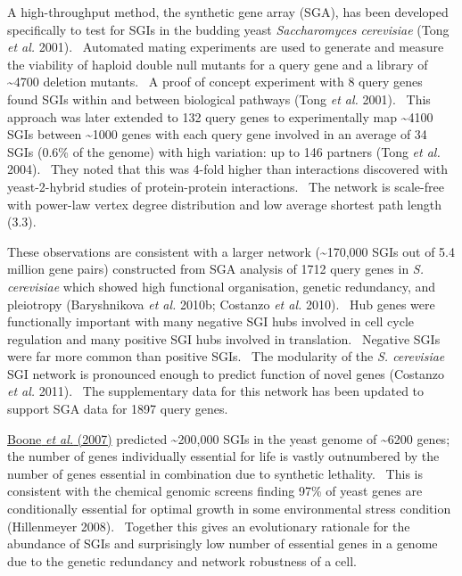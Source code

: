 A high-throughput method, the synthetic gene array (SGA), has been
developed specifically to test for SGIs in the budding yeast
\textit{Saccharomyces cerevisiae} (Tong\textit{ et al.} 2001).
\ Automated mating experiments are used to generate and measure the
viability of haploid double null mutants for a query gene and a library
of \~{}4700 deletion mutants. \ A proof of concept experiment with 8
query genes found SGIs within and between biological pathways
(Tong\textit{ et al.} 2001). \ This approach was later extended to 132
query genes to experimentally map \~{}4100 SGIs between \~{}1000 genes
with each query gene involved in an average of 34 SGIs (0.6\% of the
genome) with high variation: up to 146 partners (Tong\textit{ et al.}
2004). \ They noted that this was 4-fold higher than interactions
discovered with yeast-2-hybrid studies of protein-protein interactions.
\ The network is scale-free with power-law vertex degree distribution
and low average shortest path length (3.3). \ 


These observations are consistent with a larger network (\~{}170,000
SGIs out of 5.4 million gene pairs) constructed from SGA analysis of
1712 query genes in \textit{S. cerevisiae} which showed high functional
organisation, genetic redundancy, and pleiotropy (Baryshnikova\textit{
et al.} 2010b; Costanzo\textit{ et al.} 2010). \ Hub genes were
functionally important with many negative SGI hubs involved in cell
cycle regulation and many positive SGI hubs involved in translation.
\ Negative SGIs were far more common than positive SGIs. \ The
modularity of the \textit{S. cerevisiae} SGI network is pronounced
enough to predict function of novel genes (Costanzo\textit{ et al.}
2011). \ The supplementary data for this network has been updated to
support SGA data for 1897 query genes. \ 


\hyperlink{ENREF15}{Boone}\hyperlink{ENREF15}{\textit{ et
al.}}\hyperlink{ENREF15}{ (2007)} predicted \~{}200,000 SGIs in the
yeast genome of \~{}6200 genes; the number of genes individually
essential for life is vastly outnumbered by the number of genes
essential in combination due to synthetic lethality. \ This is
consistent with the chemical genomic screens finding 97\% of yeast
genes are conditionally essential for optimal growth in some
environmental stress condition (Hillenmeyer 2008). \ Together this
gives an evolutionary rationale for the abundance of SGIs and
surprisingly low number of essential genes in a genome due to the
genetic redundancy and network robustness of a cell. \ 


